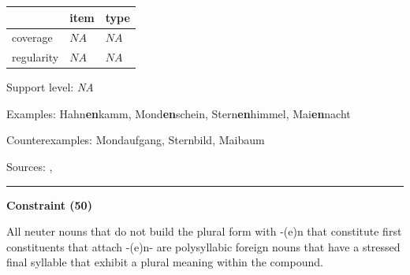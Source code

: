 \vspace{-0.25em}

\begin{table}[!ht]
\begin{center}
\setlength{\extrarowheight}{1pt}
\begin{tabularx}{\columnwidth}{|X|X|X|}
\hline
 & item & type \\
\hline
 coverage & $NA$ & $NA$ \\
\hline
 regularity & $NA$ & $NA$ \\
\hline
\end{tabularx}
\end{center}
\end{table}

\vspace{-1.35em}

\noindent
Support level: \textit{NA}

\vspace{0.3em}

\noindent
Examples: Hahn\textbf{en}kamm, Mond\textbf{en}schein, Stern\textbf{en}himmel, Mai\textbf{en}nacht

\noindent
Counterexamples: Mond{\zeroLinker}aufgang, Stern{\zeroLinker}bild, Mai{\zeroLinker}baum

\vspace{0.3em}

\noindent
Sources: \citet[79, 80]{nuebling_szczepaniak_2013}, \citet[77, 78]{ortner_mueller-bollhagen_1991}

\vspace{0.35em}
\hrule




\vspace{0.4em}

\begin{center}
\textbf{Constraint (50)}
\end{center}

\noindent
All neuter nouns that do not build the plural form with -(e)n that constitute first constituents that attach -(e)n- are polysyllabic foreign nouns that have a stressed final syllable that exhibit a plural meaning within the compound.
\vspace{0.5em}



